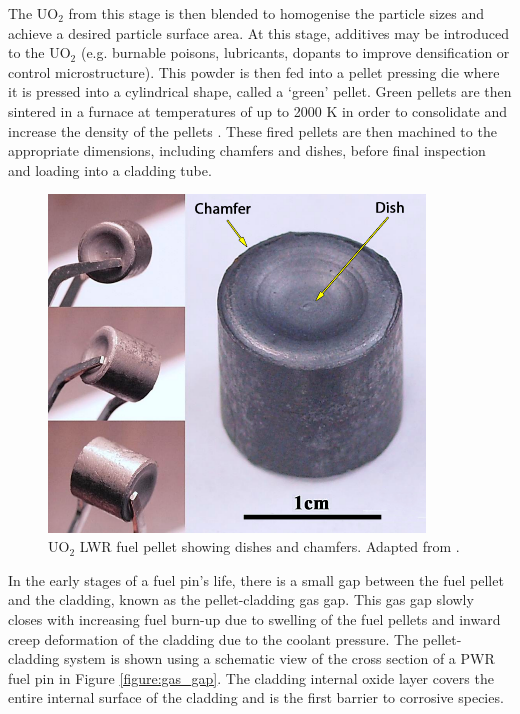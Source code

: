 The UO$_{2}$ from this stage is then blended to homogenise the particle sizes and achieve a desired particle surface area. At this stage, additives may be introduced to the UO$_{2}$ (e.g. burnable poisons, lubricants, dopants to improve densification or control microstructure). This powder is then fed into a pellet pressing die where it is pressed into a cylindrical shape, called a `green' pellet. Green pellets are then sintered in a furnace at temperatures of up to 2000 K in order to consolidate and increase the density of the pellets \cite{pramanik2010innovative}. These fired pellets are then machined to the appropriate dimensions, including chamfers and dishes, before final inspection and loading into a cladding tube.

\begin{figure}[ht]
\centering
\includegraphics[width=10cm]{images/fuelpellet.png}
\caption[UO$_{2}$ LWR fuel pellet showing dishes and chamfers.]{UO$_{2}$ LWR fuel pellet showing dishes and chamfers. Adapted from \cite{tulenko2013development}.}
\label{figure:fuelpellet}
\end{figure}

In the early stages of a fuel pin's life, there is a small gap between the fuel pellet and the cladding, known as the pellet-cladding gas gap. This gas gap slowly closes with increasing fuel burn-up due to swelling of the fuel pellets and inward creep deformation of the cladding due to the coolant pressure. The pellet-cladding system is shown using a schematic view of the cross section of a PWR fuel pin in Figure \ref{figure:gas_gap}. The cladding internal oxide layer covers the entire internal surface of the cladding and is the first barrier to corrosive species. 

